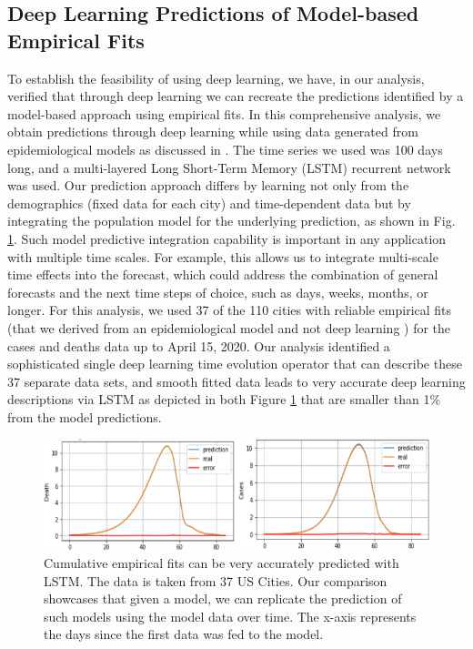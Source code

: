 \documentclass[12pt]{article}
\theoremstyle{definition}
\renewcommand{\_}{%
    \textunderscore\hspace{0pt}%
}
\begin{document}
\subsection{Deep Learning Predictions of Model-based Empirical Fits} 
\label{sec:emperical}

To establish the feasibility of using deep learning, we have, in our analysis, verified that through deep learning we can recreate the predictions identified by a model-based approach using empirical fits. In this comprehensive analysis, we obtain predictions through deep learning while using data generated from epidemiological models as discussed in \cite{marsland20-covid-paper}. The time series we used was 100 days long, and a multi-layered Long Short-Term Memory (LSTM) recurrent network was used. Our prediction approach differs by learning not only from the demographics (fixed data for each city) and time-dependent data but by integrating the population model for the underlying prediction, as shown in Fig. \ref{fig:magic-1}. Such model predictive integration capability is important in any application with multiple time scales. For example, this allows us to integrate multi-scale time effects into the forecast, which could address the combination of general forecasts and the next time steps of choice, such as days, weeks, months, or longer. For this analysis, we used 37 of the 110 cities with reliable empirical fits (that we derived from an epidemiological model and not deep learning  \cite{marsland20-covid-paper}) for the cases and deaths data up to April 15, 2020. Our analysis identified a sophisticated single deep learning time evolution operator that can describe these 37  separate data sets, and smooth fitted data leads to very accurate deep learning descriptions via LSTM as depicted in both Figure \ref{fig:magic-1} that are smaller than 1\% from the model predictions.



\begin{figure}[!h]
    \centering
    \includegraphics{images/magic-1.png}
    \caption{Cumulative empirical fits can be very accurately predicted with LSTM. The data is taken from 37 US Cities. Our comparison showcases that given a model, we can replicate the prediction of such models using the model data over time. The x-axis represents the days since the first data was fed to the model.}
    \label{fig:magic-1}
\end{figure}
\end{document}
